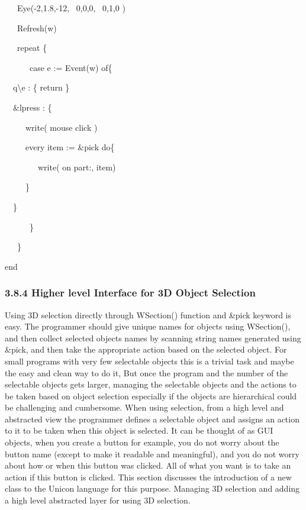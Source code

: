 \documentclass[letterpaper]{article}
\begin{document}
{{\sffamily
\ \ \ Eye(-2,1.8,-12, \ 0,0,0, \ 0,1,0 )}

{\sffamily
\ \ \ Refresh(w)}

{\sffamily
\ \ \ repeat \{}

{\sffamily
\ \ \ \ \ \ case e := Event(w) of\{}

{\sffamily
\ \  {\textquotedbl}q{\textquotedbl}{\textbar}{\textquotedbl}{\textbackslash}e{\textquotedbl} : \{ return \}
\ \ \ \ \ \ \ \ \ }

{\sffamily
\ \  \&lpress : \{\  \ }

{\sffamily
\ \  \ \ \ write({\textquotedbl} mouse click{\textquotedbl} )}

{\sffamily
\ \  \ \ \ every item := \&pick do\{}

{\sffamily
\ \  \ \ \ \ \ \ write( {\textquotedbl}on part:{\textquotedbl}, item)}

{\sffamily
\ \  \ \ \ \}}

{\sffamily
\ \  \}}

{\sffamily
\ \ \ \ \ \ \}}

{\sffamily
\ \ \ \}}

{\sffamily
end}


\subsubsection[3.8.4 Higher level Interface for 3D Object Selection]{3.8.4 Higher level Interface for 3D Object Selection}

Using 3D selection directly through \textsf{WSection()} function and
\textsf{\&}\textsf{pick} keyword is easy. The programmer should give
unique names for objects using \textsf{WSection}\textsf{()}, and then
collect selected objects names by scanning string names generated
using \textsf{\&pick}, and then take the appropriate action based on
the selected object. For small programs with very few selectable
objects this is a trivial task and maybe the easy and clean way to do
it, But once the program and the number of the selectable objects gets
larger, managing the selectable objects and the actions to be taken
based on object selection especially if the objects are hierarchical
could be challenging and cumbersome. When using selection, from a high
level and abstracted view the programmer defines a selectable object
and assigns an action to it to be taken when this object is
selected. It can be thought of as GUI objects, when you create a
button for example, you do not worry about the button name (except to
make it readable and meaningful), and you do not worry about how or
when this button was clicked. All of what you want is to take an
action if this button is clicked. This section discusses the
introduction of a new class to the Unicon language for this
purpose. Managing 3D selection and adding a high level abstracted
layer for using 3D selection.

}
\end{document}
